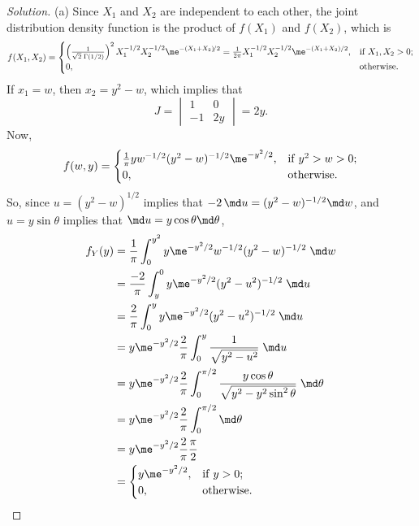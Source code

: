 \begin{proof}[Solution]
  (a) Since $X_1$ and $X_2$ are independent to each other,
  the joint distribution density function is the product of $f(X_1)$ and $f(X_2)$, which is
    $$
      f(X_1,X_2)=
        \begin{cases}
          \left(\frac{1}{\sqrt{2}\;\Gamma(1/2)}\right)^2X_1^{-1/2}X_2^{-1/2}\me^{-(X_1+X_2)\!/2}
          =\frac{1}{2\pi}X_1^{-1/2}X_2^{-1/2}\me^{-(X_1+X_2)/2}, & \mathrm{if}\;X_1,X_2>0; \\
          0, & \mathrm{otherwise}.
        \end{cases}
    $$
  If $x_1=w$, then $x_2=y^2-w$, which implies that
    $$
      J=
        \begin{vmatrix}
          1 & 0 \\
          -1 & 2y
        \end{vmatrix}
      =2y.
    $$
  Now,
    $$
      f(w,y)=
        \begin{cases}
          \frac{1}{\pi}yw^{-1/2}(y^2-w)^{-1/2}\me^{-y^2/2}, & \mathrm{if}\;y^2>w>0; \\
          0, & \mathrm{otherwise}.
        \end{cases}
    $$
  So, since $u=(y^2-w)^{1/2}$ implies that $-2\,\md u=(y^2-w)^{-1/2}\md w$, and $u=y\sin\theta$ implies that $\md u=y\cos\theta \md \theta$,
    \begin{align*}
      f_Y(y)&=\frac{1}{\pi}\int_0^{y^2}y\me^{-y^2/2}w^{-1/2}(y^2-w)^{-1/2}\;\md w \\
      &=\frac{-2}{\pi}\int_y^0y\me^{-y^2/2}(y^2-u^2)^{-1/2}\;\md u \\
      &=\frac{2}{\pi}\int_0^yy\me^{-y^2/2}(y^2-u^2)^{-1/2}\;\md u \\ &=y\me^{-y^2/2}\frac{2}{\pi}\int_0^y\frac{1}{\sqrt{y^2-u^2}}\;\md u\\
      &=y\me^{-y^2/2}\frac{2}{\pi}\int_0^{\pi/2}\frac{y\cos\theta}{\sqrt{y^2-y^2\sin^2\theta}}\;\md \theta\\
      &=y\me^{-y^2/2}\frac{2}{\pi}\int_0^{\pi/2}\md \theta\\
      &=y\me^{-y^2/2}\frac{2}{\pi}\frac{\pi}{2}\\
      &=\begin{cases}
         y\me^{-y^2/2}, & \mathrm{if}\;y>0; \\
          0, & \mathrm{otherwise}.
        \end{cases}
    \end{align*}


\end{proof}

